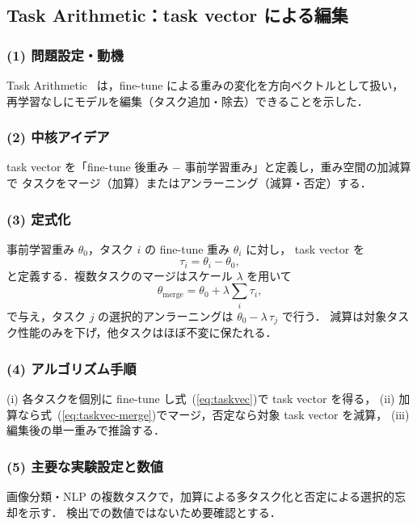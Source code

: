 \subsection{Task Arithmetic：task vector による編集}
\label{sub:taskarith}

\subsubsection*{(1) 問題設定・動機}
Task Arithmetic~\cite{taskarith} は，fine-tune による重みの変化を方向ベクトルとして扱い，
再学習なしにモデルを編集（タスク追加・除去）できることを示した．

\subsubsection*{(2) 中核アイデア}
task vector を「fine-tune 後重み $-$ 事前学習重み」と定義し，重み空間の加減算で
タスクをマージ（加算）またはアンラーニング（減算・否定）する．

\subsubsection*{(3) 定式化}
事前学習重み $\theta_0$，タスク $i$ の fine-tune 重み $\theta_i$ に対し，
task vector を
\begin{equation}
\tau_i = \theta_i - \theta_0,
\label{eq:taskvec}
\end{equation}
と定義する．複数タスクのマージはスケール $\lambda$ を用いて
\begin{equation}
\theta_{\mathrm{merge}} = \theta_0 + \lambda \sum_{i} \tau_i,
\label{eq:taskvec-merge}
\end{equation}
で与え，タスク $j$ の選択的アンラーニングは $\theta_0 - \lambda\,\tau_j$ で行う．
減算は対象タスク性能のみを下げ，他タスクはほぼ不変に保たれる．

\subsubsection*{(4) アルゴリズム手順}
(i) 各タスクを個別に fine-tune し式~(\ref{eq:taskvec})で task vector を得る，
(ii) 加算なら式~(\ref{eq:taskvec-merge})でマージ，否定なら対象 task vector を減算，
(iii) 編集後の単一重みで推論する．

\subsubsection*{(5) 主要な実験設定と数値}
画像分類・NLP の複数タスクで，加算による多タスク化と否定による選択的忘却を示す．
検出での数値ではないため要確認とする．

